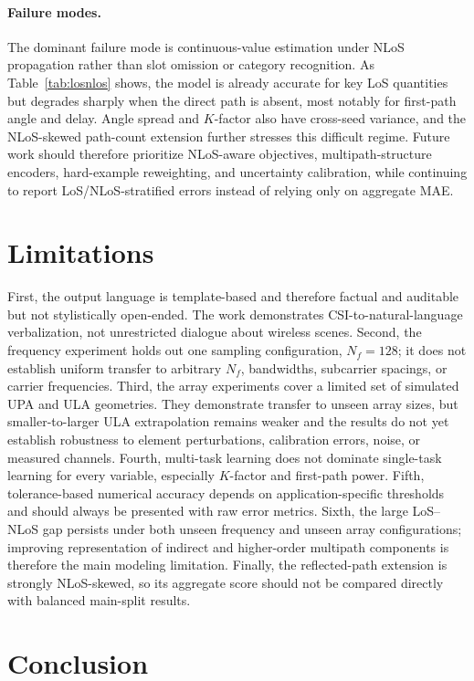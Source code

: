 \documentclass{article}
\begin{document}
\paragraph{Failure modes.}
The dominant failure mode is continuous-value estimation under NLoS propagation rather than slot omission or category recognition.
As Table~\ref{tab:losnlos} shows, the model is already accurate for key LoS quantities but degrades sharply when the direct path is absent, most notably for first-path angle and delay.
Angle spread and $K$-factor also have cross-seed variance, and the NLoS-skewed path-count extension further stresses this difficult regime.
Future work should therefore prioritize NLoS-aware objectives, multipath-structure encoders, hard-example reweighting, and uncertainty calibration, while continuing to report LoS/NLoS-stratified errors instead of relying only on aggregate MAE.

\section{Limitations}

First, the output language is template-based and therefore factual and auditable but not stylistically open-ended.
The work demonstrates CSI-to-natural-language verbalization, not unrestricted dialogue about wireless scenes.
Second, the frequency experiment holds out one sampling configuration, $N_f=128$; it does not establish uniform transfer to arbitrary $N_f$, bandwidths, subcarrier spacings, or carrier frequencies.
Third, the array experiments cover a limited set of simulated UPA and ULA geometries.
They demonstrate transfer to unseen array sizes, but smaller-to-larger ULA extrapolation remains weaker and the results do not yet establish robustness to element perturbations, calibration errors, noise, or measured channels.
Fourth, multi-task learning does not dominate single-task learning for every variable, especially $K$-factor and first-path power.
Fifth, tolerance-based numerical accuracy depends on application-specific thresholds and should always be presented with raw error metrics.
Sixth, the large LoS--NLoS gap persists under both unseen frequency and unseen array configurations; improving representation of indirect and higher-order multipath components is therefore the main modeling limitation.
Finally, the reflected-path extension is strongly NLoS-skewed, so its aggregate score should not be compared directly with balanced main-split results.

\section{Conclusion}
\end{document}

